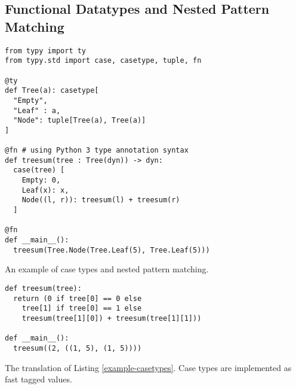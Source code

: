 \documentclass[preprint,10pt]{sigplanconf}
\begin{document}
\subsection{Functional Datatypes and Nested Pattern Matching}
\begin{codelisting}[t]
\begin{lstlisting}
from typy import ty
from typy.std import case, casetype, tuple, fn

@ty
def Tree(a): casetype[
  "Empty",
  "Leaf" : a,
  "Node": tuple[Tree(a), Tree(a)]
]

@fn # using Python 3 type annotation syntax
def treesum(tree : Tree(dyn)) -> dyn:
  case(tree) [
    Empty: 0,
    Leaf(x): x,
    Node((l, r)): treesum(l) + treesum(r)
  ]

@fn
def __main__():
  treesum(Tree.Node(Tree.Leaf(5), Tree.Leaf(5)))
\end{lstlisting}
\caption{An example of case types and nested pattern matching.}
\label{example-casetypes}
\end{codelisting}
\begin{codelisting}[t]
\begin{lstlisting}
def treesum(tree):
  return (0 if tree[0] == 0 else 
    tree[1] if tree[0] == 1 else 
    treesum(tree[1][0]) + treesum(tree[1][1]))

def __main__():
  treesum((2, ((1, 5), (1, 5))))
\end{lstlisting}
\caption{The translation of Listing \ref{example-casetypes}. Case types are implemented as fast tagged values.}
\label{example-casetypes-out}
\end{codelisting}
\end{document}

